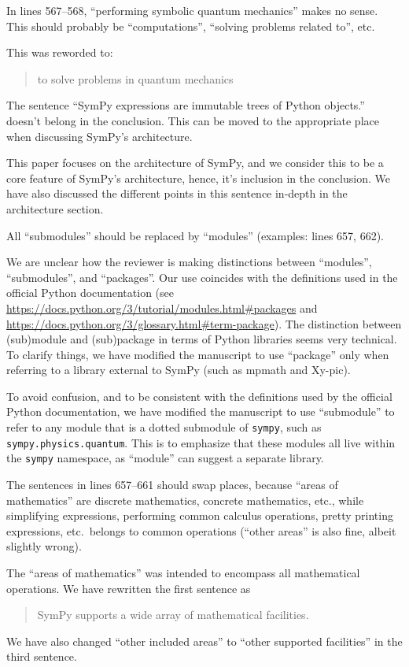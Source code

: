 \documentclass[answers,12pt]{exam}
\begin{document}
\begin{questions}
\question In lines 567--568, ``performing symbolic quantum mechanics'' makes no sense. This should probably be ``computations'', ``solving problems related to'', etc.
\begin{solution}
This was reworded to:
\begin{quote}
to solve problems in quantum mechanics
\end{quote}
\end{solution}

\question The sentence ``SymPy expressions are immutable trees of Python objects.'' doesn't belong in the conclusion. This can be moved to the appropriate place when discussing SymPy's architecture.
\begin{solution}
This paper focuses on the architecture of SymPy, and we consider this to be a
core feature of SymPy's architecture, hence, it's inclusion in the conclusion.
We have also discussed the different points in this sentence in-depth in the architecture section.
\end{solution}

\question All ``submodules'' should be replaced by ``modules'' (examples:
lines 657, 662).
\label{rev1point37}
\begin{solution}
We are unclear how the reviewer is making distinctions between ``modules'',
``submodules'', and ``packages''. Our use coincides with the definitions used
in the official Python documentation (see
\url{https://docs.python.org/3/tutorial/modules.html#packages} and
\url{https://docs.python.org/3/glossary.html#term-package}). The distinction
between (sub)module and (sub)package in terms of Python libraries seems very
technical. To clarify things, we have modified the manuscript to use
``package'' only when referring to a library external to SymPy (such as
mpmath and Xy-pic).

To avoid confusion, and to be consistent with the definitions used by the
official Python documentation, we have modified the manuscript to use
``submodule'' to refer to any module that is a dotted submodule of
\texttt{sympy}, such as \texttt{sympy.physics.quantum}. This is to emphasize
that these modules all live within the \texttt{sympy} namespace, as ``module''
can suggest a separate library.
\end{solution}

\question The sentences in lines 657--661 should swap places, because ``areas of mathematics'' are discrete mathematics, concrete mathematics, etc., while simplifying expressions, performing common calculus operations, pretty printing expressions, etc.\ belongs to common operations (``other areas'' is also fine, albeit slightly wrong).
\begin{solution}
The ``areas of mathematics'' was intended to encompass all mathematical
operations. We have rewritten the first sentence as
\begin{quote}
SymPy supports a wide array of mathematical facilities.
\end{quote}
We have also changed ``other included areas'' to ``other supported facilities'' in the third sentence.


\end{solution}
\end{questions}
\end{document}
